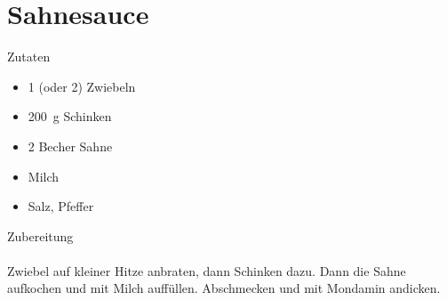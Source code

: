 \section*{Sahnesauce}
\ihead{}\ohead{}
\cfoot{}
{\Large Zutaten}
\begin{itemize}
    \item \num{1} (oder \num{2}) Zwiebeln
    \item \SI{200}{g} Schinken
    \item \num{2} Becher Sahne
    \item Milch
    \item Salz, Pfeffer
\end{itemize}
\noindent
{\Large Zubereitung}\\
\\
Zwiebel auf kleiner Hitze anbraten, dann Schinken dazu.
Dann die Sahne aufkochen und mit Milch auffüllen.
Abschmecken und mit Mondamin andicken.